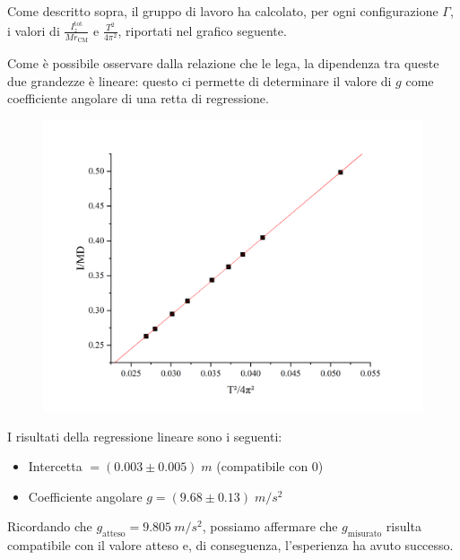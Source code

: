\documentclass{article}
\begin{document}
\vspace{2mm}

Come descritto sopra, il gruppo di lavoro ha calcolato, per ogni
configurazione $\Gamma$,
i valori di $\frac{I_z^\text{tot}}{Mr_\text{CM}}$
e $\frac{T^2}{4\pi^2}$, riportati nel grafico seguente.

Come è possibile osservare dalla relazione che le lega, la dipendenza
tra queste due grandezze è lineare: questo ci permette di determinare
il valore di $g$ come coefficiente angolare di una retta di regressione.

\begin{figure}[H]
  \includegraphics[trim={2cm 1cm 2cm 2.1cm},clip,width=\textwidth]{img/regressione.png}
\end{figure}

I risultati della regressione lineare sono i seguenti:
\begin{itemize}
  \item Intercetta $= (0.003 \pm 0.005)\;\unit{m}$
    (compatibile con $0$)
  \item Coefficiente angolare $g = (9.68 \pm 0.13)\;\unit{m\per s^2}$
\end{itemize}
Ricordando che $g_\text{atteso} = \qty{9.805}{m\per s^2}$,
possiamo affermare che $g_\text{misurato}$ risulta compatibile con
il valore atteso e, di conseguenza, l'esperienza ha avuto successo.

\pagebreak
\end{document}
